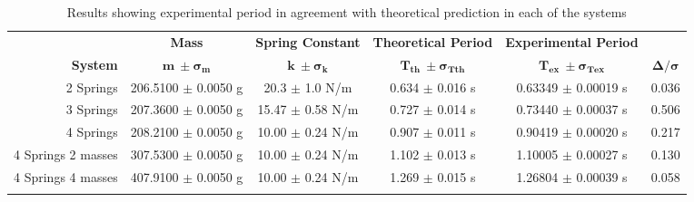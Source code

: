 \begin{table*}[ht]
        \begin{ruledtabular}
        \begin{tabular*}{\textwidth}{rccccc} %
    
            & \textbf{Mass}
                & \textbf{Spring Constant}
                    & \textbf{Theoretical Period}
                        & \textbf{Experimental Period}
                            & \\
        
        \textbf{System}
            & $\bm{m\ \pm \sigma_{m}}$
                & $\bm{k\ \pm \sigma_{k}}$
                    & $\bm{T_{th}\ \pm \sigma_{Tth}}$
                        & $\bm{T_{ex}\ \pm \sigma_{Tex}}$ 
                            & $\bm{{\Delta}/{\sigma}}$\\\midrule\addlinespace[.2cm]
        
        {2 Springs}
            & 206.5100 $\pm$ 0.0050 g
                & 20.3 $\pm$ 1.0 N/m
                    & 0.634 $\pm$ 0.016 s
                        & 0.63349 $\pm$ 0.00019 s
                            & {0.036}\\\addlinespace[.2cm]
        
        {3 Springs} 
            & 207.3600 $\pm$ 0.0050 g
                & 15.47 $\pm$ 0.58 N/m
                    & 0.727 $\pm$ 0.014 s
                        & 0.73440 $\pm$ 0.00037 s
                            & 0.506\\\addlinespace[.2cm]
        
        {4 Springs} 
            & 208.2100 $\pm$ 0.0050 g
                & 10.00 $\pm$ 0.24 N/m
                    & 0.907 $\pm$ 0.011 s
                        & 0.90419 $\pm$ 0.00020 s
                            & 0.217\\\addlinespace[.2cm]
        
        {4 Springs 2 masses} 
            & 307.5300 $\pm$ 0.0050 g
                & 10.00 $\pm$ 0.24 N/m
                    & 1.102 $\pm$ 0.013 s
                        & 1.10005 $\pm$ 0.00027 s
                            & 0.130\\\addlinespace[.2cm]
        
        {4 Springs 4 masses} 
            & 407.9100 $\pm$ 0.0050 g
                & 10.00 $\pm$ 0.24 N/m
                    & 1.269 $\pm$ 0.015 s
                        & 1.26804 $\pm$ 0.00039 s
                            & 0.058\\\addlinespace[.2cm]
    \end{tabular*}
    \end{ruledtabular}
    \caption{\centering Results showing experimental period in agreement with theoretical prediction in each of the systems} \label{tab:table1}
\end{table*}